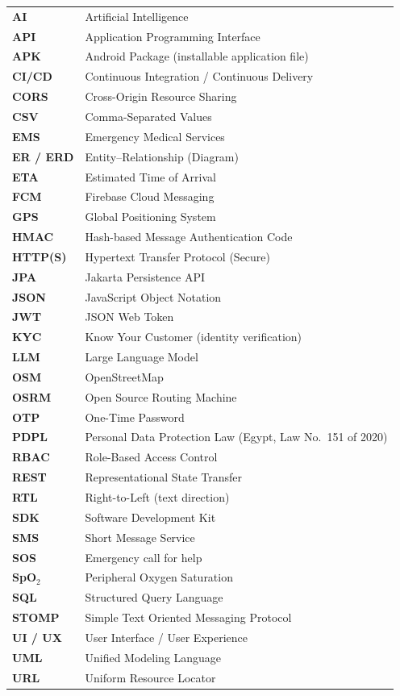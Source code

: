 
{\small
\renewcommand{\arraystretch}{1.28}
\begin{longtable}{@{}>{\sffamily\bfseries\color{najdanavy}}p{2.6cm}p{11.3cm}@{}}
AI      & Artificial Intelligence \\
API     & Application Programming Interface \\
APK     & Android Package (installable application file) \\
CI/CD   & Continuous Integration / Continuous Delivery \\
CORS    & Cross-Origin Resource Sharing \\
CSV     & Comma-Separated Values \\
EMS     & Emergency Medical Services \\
ER / ERD & Entity--Relationship (Diagram) \\
ETA     & Estimated Time of Arrival \\
FCM     & Firebase Cloud Messaging \\
GPS     & Global Positioning System \\
HMAC    & Hash-based Message Authentication Code \\
HTTP(S) & Hypertext Transfer Protocol (Secure) \\
JPA     & Jakarta Persistence API \\
JSON    & JavaScript Object Notation \\
JWT     & JSON Web Token \\
KYC     & Know Your Customer (identity verification) \\
LLM     & Large Language Model \\
OSM     & OpenStreetMap \\
OSRM    & Open Source Routing Machine \\
OTP     & One-Time Password \\
PDPL    & Personal Data Protection Law (Egypt, Law No.~151 of 2020) \\
RBAC    & Role-Based Access Control \\
REST    & Representational State Transfer \\
RTL     & Right-to-Left (text direction) \\
SDK     & Software Development Kit \\
SMS     & Short Message Service \\
SOS     & Emergency call for help \\
SpO$_2$ & Peripheral Oxygen Saturation \\
SQL     & Structured Query Language \\
STOMP   & Simple Text Oriented Messaging Protocol \\
UI / UX & User Interface / User Experience \\
UML     & Unified Modeling Language \\
URL     & Uniform Resource Locator \\
\end{longtable}}
\clearpage
